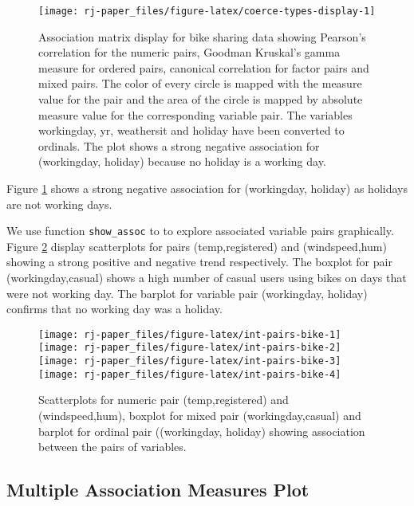 \begin{figure}

{\centering \texttt{[image: rj-paper\_files/figure-latex/coerce-types-display-1]} 

}

\caption{Association matrix display for bike sharing data showing Pearson's correlation for the numeric pairs, Goodman Kruskal's gamma measure for ordered pairs, canonical correlation for factor pairs and mixed pairs. The color of every circle is mapped with the measure value for the pair and the area of the circle is mapped by absolute measure value for the corresponding variable pair. The variables workingday, yr, weathersit and holiday have been converted to ordinals. The plot shows a strong negative association for (workingday, holiday) because no holiday is a working day.}\label{fig:coerce-types-display}
\end{figure}

Figure \ref{fig:coerce-types-display} shows a strong negative association for (workingday, holiday) as holidays are not working days.

We use function \texttt{show\_assoc} to to explore associated variable pairs graphically. Figure \ref{fig:int-pairs-bike} display scatterplots for pairs (temp,registered) and (windspeed,hum) showing a strong positive and negative trend respectively. The boxplot for pair (workingday,casual) shows a high number of casual users using bikes on days that were not working day. The barplot for variable pair (workingday, holiday) confirms that no working day was a holiday.

\begin{figure}
\texttt{[image: rj-paper\_files/figure-latex/int-pairs-bike-1]} \texttt{[image: rj-paper\_files/figure-latex/int-pairs-bike-2]} \texttt{[image: rj-paper\_files/figure-latex/int-pairs-bike-3]} \texttt{[image: rj-paper\_files/figure-latex/int-pairs-bike-4]} \caption{Scatterplots for numeric pair (temp,registered) and (windspeed,hum),  boxplot for mixed pair (workingday,casual) and barplot for ordinal pair ((workingday, holiday) showing association between the pairs of variables.}\label{fig:int-pairs-bike}
\end{figure}

\hypertarget{multiple-association-measures-plot}{%
\subsection{Multiple Association Measures Plot}\label{multiple-association-measures-plot}}

